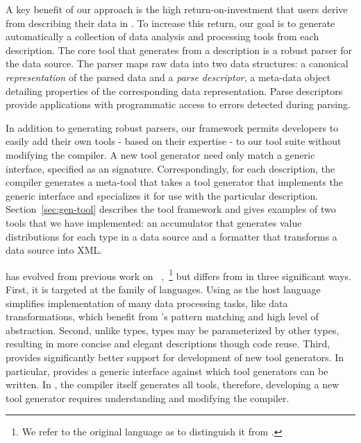 

A key benefit of our approach is the high return-on-investment that
users derive from describing their data in \padsml{}.  To increase
this return, our goal is to generate automatically a collection of
data analysis and processing tools from each description.  The core
tool that \padsml{} generates from a description is a robust parser
for the data source.  The parser maps raw data into two data
structures: a canonical \textit{representation} of the parsed data and
a \textit{parse descriptor}, a meta-data object detailing properties
of the corresponding data representation.  Parse descriptors provide
applications with programmatic access to errors detected during
parsing.

In addition to generating robust parsers, our framework permits
developers to easily add their own tools - based on their expertise -
to our tool suite without modifying the \padsml{} compiler.  A new
tool generator need only match a generic interface, specified as an
\ml{} signature.  Correspondingly, for each \padsml{} description, the
\padsml{} compiler generates a meta-tool that takes a tool generator
that implements the generic interface and specializes it for use with
the particular description.  Section~\ref{sec:gen-tool} describes the
tool framework and gives examples of two tools that we have
implemented: an accumulator that generates value distributions for
each type in a data source and a formatter that transforms a data
source into XML.

\padsml{} has evolved from previous work on
\padsc{}~\cite{fisher+:pads},~\footnote{We refer to the original
\pads{} language as \padsc{} to distinguish it from \padsml{}.} but
\padsml{} differs from \padsc{} in three significant ways.  First, it
is targeted at the \ml{} family of languages.  Using \ml{} as the host
language simplifies implementation of many data processing tasks, like
data transformations, which benefit from \ml{}'s pattern matching and
high level of abstraction.  Second, unlike \padsc{} types, \padsml{}
types may be parameterized by other types, resulting in more concise
and elegant descriptions though code reuse.  Third, \padsml{} provides
significantly better support for development of new tool generators.
In particular, \padsml{} provides a generic interface against which
tool generators can be written.  In \padsc{}, the compiler itself
generates all tools, therefore, developing a new tool generator
requires understanding and modifying the compiler.


